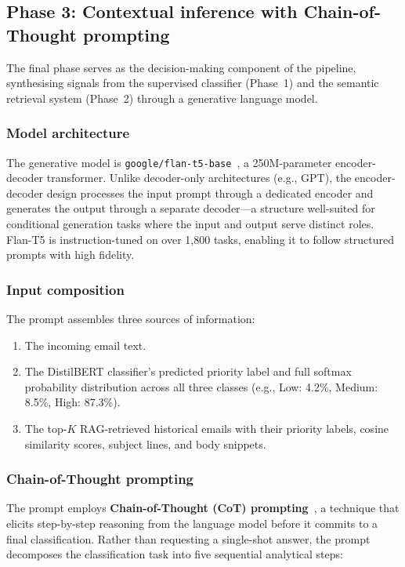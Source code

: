 \documentclass[3p,times,procedia]{elsarticle}
\begin{document}
\subsection{Phase 3: Contextual inference with Chain-of-Thought prompting}
\label{sec:phase3}

The final phase serves as the decision-making component of the pipeline, synthesising signals from the supervised classifier (Phase~1) and the semantic retrieval system (Phase~2) through a generative language model.

\subsubsection{Model architecture}

The generative model is \texttt{google/flan-t5-base}~\cite{chung2022}, a 250M-parameter encoder-decoder transformer. Unlike decoder-only architectures (e.g., GPT), the encoder-decoder design processes the input prompt through a dedicated encoder and generates the output through a separate decoder---a structure well-suited for conditional generation tasks where the input and output serve distinct roles. Flan-T5 is instruction-tuned on over 1,800 tasks, enabling it to follow structured prompts with high fidelity.

\subsubsection{Input composition}

The prompt assembles three sources of information:

\begin{enumerate}
\item The incoming email text.
\item The DistilBERT classifier's predicted priority label and full softmax probability distribution across all three classes (e.g., Low: 4.2\%, Medium: 8.5\%, High: 87.3\%).
\item The top-$K$ RAG-retrieved historical emails with their priority labels, cosine similarity scores, subject lines, and body snippets.
\end{enumerate}

\subsubsection{Chain-of-Thought prompting}

The prompt employs \textbf{Chain-of-Thought (CoT) prompting}~\cite{wei2022}, a technique that elicits step-by-step reasoning from the language model before it commits to a final classification. Rather than requesting a single-shot answer, the prompt decomposes the classification task into five sequential analytical steps:
\end{document}

